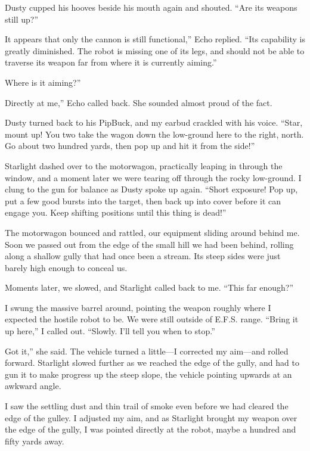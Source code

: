 Dusty cupped his hooves beside his mouth again and shouted. “Are its weapons still up?”

\leavevmode{}It appears that only the cannon is still functional,” Echo replied. “Its capability is greatly diminished. The robot is missing one of its legs, and should not be able to traverse its weapon far from where it is currently aiming.”

\leavevmode{}Where is it aiming?”

\leavevmode{}Directly at me,” Echo called back. She sounded almost proud of the fact.

Dusty turned back to his PipBuck, and my earbud crackled with his voice. “Star, mount up! You two take the wagon down the low-ground here to the right, north. Go about two hundred yards, then pop up and hit it from the side!”

Starlight dashed over to the motorwagon, practically leaping in through the window, and a moment later we were tearing off through the rocky low-ground. I clung to the gun for balance as Dusty spoke up again. “Short exposure! Pop up, put a few good bursts into the target, then back up into cover before it can engage you. Keep shifting positions until this thing is dead!”

The motorwagon bounced and rattled, our equipment sliding around behind me. Soon we passed out from the edge of the small hill we had been behind, rolling along a shallow gully that had once been a stream. Its steep sides were just barely high enough to conceal us.

Moments later, we slowed, and Starlight called back to me. “This far enough?”

I swung the massive barrel around, pointing the weapon roughly where I expected the hostile robot to be. We were still outside of E.F.S. range. “Bring it up here,” I called out. “Slowly. I’ll tell you when to stop.”

\leavevmode{}Got it,” she said. The vehicle turned a little—I corrected my aim—and rolled forward. Starlight slowed further as we reached the edge of the gully, and had to gun it to make progress up the steep slope, the vehicle pointing upwards at an awkward angle.

I saw the settling dust and thin trail of smoke even before we had cleared the edge of the gulley. I adjusted my aim, and as Starlight brought my weapon over the edge of the gully, I was pointed directly at the robot, maybe a hundred and fifty yards away.

